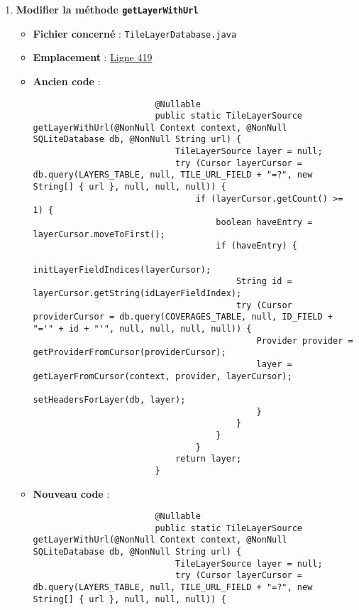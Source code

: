 \begin{enumerate}
    \item \textbf{Modifier la méthode \texttt{getLayerWithUrl}}
          \begin{itemize}
              \item \textbf{Fichier concerné} : \texttt{TileLayerDatabase.java}
              \item \textbf{Emplacement} :
                    \href{https://github.com/MarcusWolschon/osmeditor4android/blob/master/src/main/java/de/blau/android/resources/TileLayerDatabase.java#L419 }{Ligne 419}
              \item \textbf{Ancien code} :
                    \begin{verbatim}
                        @Nullable
                        public static TileLayerSource getLayerWithUrl(@NonNull Context context, @NonNull SQLiteDatabase db, @NonNull String url) {
                            TileLayerSource layer = null;
                            try (Cursor layerCursor = db.query(LAYERS_TABLE, null, TILE_URL_FIELD + "=?", new String[] { url }, null, null, null)) {
                                if (layerCursor.getCount() >= 1) {
                                    boolean haveEntry = layerCursor.moveToFirst();
                                    if (haveEntry) {
                                        initLayerFieldIndices(layerCursor);
                                        String id = layerCursor.getString(idLayerFieldIndex);
                                        try (Cursor providerCursor = db.query(COVERAGES_TABLE, null, ID_FIELD + "='" + id + "'", null, null, null, null)) {
                                            Provider provider = getProviderFromCursor(providerCursor);
                                            layer = getLayerFromCursor(context, provider, layerCursor);
                                            setHeadersForLayer(db, layer);
                                            }
                                        }
                                    }
                                }
                            return layer;
                        }
\end{verbatim}
              \item \textbf{Nouveau code} :
                    \begin{verbatim}
                        @Nullable
                        public static TileLayerSource getLayerWithUrl(@NonNull Context context, @NonNull SQLiteDatabase db, @NonNull String url) {
                            TileLayerSource layer = null;
                            try (Cursor layerCursor = db.query(LAYERS_TABLE, null, TILE_URL_FIELD + "=?", new String[] { url }, null, null, null)) {

\end{verbatim}
\end{itemize}
\end{enumerate}
